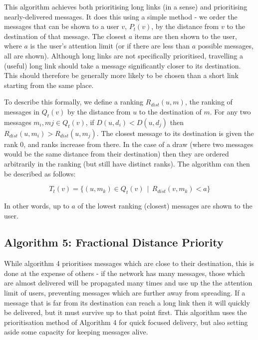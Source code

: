 \documentclass[bsc,frontabs,twoside,singlespacing,parskip,deptreport]{infthesis}     %
\begin{document}
This algorithm achieves both prioritising long links (in a sense) and prioritising nearly-delivered messages. It does this using a simple method - we order the messages that can be shown to a user $v$, $P_{t}(v)$, by the distance from $v$ to the destination of that message. The closest $a$ items are then shown to the user, where $a$ is the user's attention limit (or if there are less than $a$ possible messages, all are shown). Although long links are not specifically prioritised, travelling a (useful) long link should take a message significantly closer to its destination. This should therefore be generally more likely to be chosen than a short link starting from the same place.

To describe this formally, we define a ranking $R_{dist}(u, m)$, the ranking of messages in $Q_{t}(v)$ by the distance from $u$ to the destination of $m$. For any two messages $m_{i}, m{j} \in Q_{t}(v)$, if $D(u, d_{i}) < D(u, d_{j})$ then $R_{dist}(u, m_{i}) > R_{dist}(u, m_{j})$. The closest message to its destination is given the rank 0, and ranks increase from there. In the case of a draw (where two messages would be the same distance from their destination) then they are ordered arbitrarily in the ranking (but still have distinct ranks). The algorithm can then be described as follows:

\begin{equation}
T_{t}(v) = \{ (u, m_{k}) \in Q_{t}(v) \:\: | \:\: R_{dist}(v, m_{k}) < a \}
\end{equation}

In other words, up to $a$ of the lowest ranking (closest) messages are shown to the user.

\subsection{Algorithm 5: Fractional Distance Priority}
While algorithm 4 prioritises messages which are close to their destination, this is done at the expense of others - if the network has many messages, those which are almost delivered will be propagated many times and use up the the attention limit of users, preventing messages which are further away from spreading. If a message that is far from its destination can reach a long link then it will quickly be delivered, but it must survive up to that point first. This algorithm uses the prioritisation method of Algorithm 4 for quick focused delivery, but also setting aside some capacity for keeping messages alive.
\end{document}

